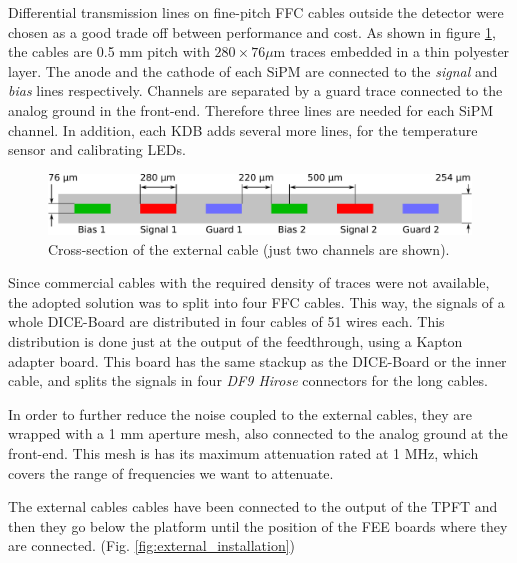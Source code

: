 Differential transmission lines on fine-pitch FFC cables outside the detector were chosen as a good trade off between performance and cost. As shown in figure \ref{fig:external}, the cables are 0.5 mm pitch with $280 \times 76 \mu$m traces embedded in a thin polyester layer. The anode and the cathode of each SiPM are connected to the \textit{signal} and \textit{bias} lines respectively. Channels are separated by a guard trace connected to the analog ground in the front-end. Therefore three lines are needed for each SiPM channel. In addition, each KDB adds several more lines, for the  temperature sensor and  calibrating LEDs.

\begin{figure}[hpt!]
\centering
\includegraphics[width=.6\textwidth]{TrackingPlane/IMG/section.pdf}
\caption{Cross-section of the external cable (just two channels are shown).}
\label{fig:external}
\end{figure}

Since commercial cables with the required density of traces were not available, the adopted solution was to split into four FFC cables. This way, the signals of a whole DICE-Board are distributed in four cables of 51 wires each. This distribution is done just at the output of the feedthrough, using a Kapton adapter board. This board has the same stackup as the DICE-Board or the inner cable, and splits the signals in four \textit{DF9 Hirose} connectors for the long cables.

In order to further reduce the noise coupled to the external cables, they are wrapped with a 1 mm aperture mesh, also connected to the analog ground at the front-end. This mesh is has its maximum attenuation rated at 1 MHz, which covers the range of frequencies we want to attenuate.

The external cables cables have been connected to the output of the TPFT and then they go below the platform until the position of the FEE boards where they are connected. (Fig. \ref{fig:external_installation})


